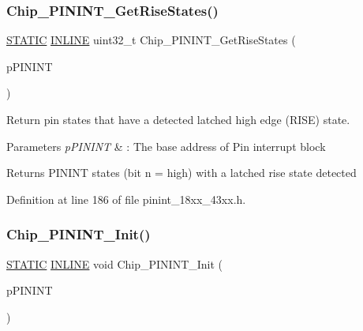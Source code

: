 \subsubsection{\texorpdfstring{Chip\+\_\+\+P\+I\+N\+I\+N\+T\+\_\+\+Get\+Rise\+States()}{Chip\_PININT\_GetRiseStates()}}
{\footnotesize\ttfamily \hyperlink{group___l_p_c___types___public___macros_ga10b2d890d871e1489bb02b7e70d9bdfb}{S\+T\+A\+T\+IC} \hyperlink{spifi__18xx__43xx_8h_a2eb6f9e0395b47b8d5e3eeae4fe0c116}{I\+N\+L\+I\+NE} uint32\+\_\+t Chip\+\_\+\+P\+I\+N\+I\+N\+T\+\_\+\+Get\+Rise\+States (\begin{DoxyParamCaption}\item[{\hyperlink{struct_l_p_c___p_i_n___i_n_t___t}{L\+P\+C\+\_\+\+P\+I\+N\+\_\+\+I\+N\+T\+\_\+T} $\ast$}]{p\+P\+I\+N\+I\+NT }\end{DoxyParamCaption})}



Return pin states that have a detected latched high edge (R\+I\+SE) state. 


\begin{DoxyParams}{Parameters}
{\em p\+P\+I\+N\+I\+NT} & \+: The base address of Pin interrupt block \\
\hline
\end{DoxyParams}
\begin{DoxyReturn}{Returns}
P\+I\+N\+I\+NT states (bit n = high) with a latched rise state detected 
\end{DoxyReturn}


Definition at line 186 of file pinint\+\_\+18xx\+\_\+43xx.\+h.

\mbox{\label{group___p_i_n_i_n_t__18_x_x__43_x_x_ga7d5f017f430fbecd18810fa08e7baef0}} 
\subsubsection{\texorpdfstring{Chip\+\_\+\+P\+I\+N\+I\+N\+T\+\_\+\+Init()}{Chip\_PININT\_Init()}}
{\footnotesize\ttfamily \hyperlink{group___l_p_c___types___public___macros_ga10b2d890d871e1489bb02b7e70d9bdfb}{S\+T\+A\+T\+IC} \hyperlink{spifi__18xx__43xx_8h_a2eb6f9e0395b47b8d5e3eeae4fe0c116}{I\+N\+L\+I\+NE} void Chip\+\_\+\+P\+I\+N\+I\+N\+T\+\_\+\+Init (\begin{DoxyParamCaption}\item[{\hyperlink{struct_l_p_c___p_i_n___i_n_t___t}{L\+P\+C\+\_\+\+P\+I\+N\+\_\+\+I\+N\+T\+\_\+T} $\ast$}]{p\+P\+I\+N\+I\+NT }\end{DoxyParamCaption})}



